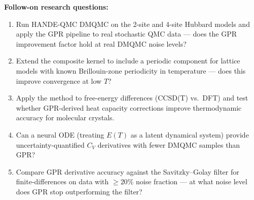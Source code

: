 \documentclass[11pt]{article}
\begin{document}
\noindent\textbf{Follow-on research questions:}
\begin{enumerate}[leftmargin=1.6em,itemsep=0.2em,topsep=0.2em,label=Q\arabic*.]
\item Run HANDE-QMC DMQMC on the 2-site and 4-site Hubbard models and apply the GPR pipeline to real stochastic QMC data --- does the GPR improvement factor hold at real DMQMC noise levels?
\item Extend the composite kernel to include a periodic component for lattice models with known Brillouin-zone periodicity in temperature --- does this improve convergence at low $T$?
\item Apply the method to free-energy differences (CCSD(T) vs.\ DFT) and test whether GPR-derived heat capacity corrections improve thermodynamic accuracy for molecular crystals.
\item Can a neural ODE (treating $E(T)$ as a latent dynamical system) provide uncertainty-quantified $C_V$ derivatives with fewer DMQMC samples than GPR?
\item Compare GPR derivative accuracy against the Savitzky--Golay filter for finite-differences on data with $\geq 20\%$ noise fraction --- at what noise level does GPR stop outperforming the filter?
\end{enumerate}
\end{document}

